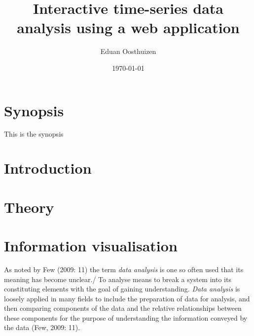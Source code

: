 \documentclass[a4paper,12pt]{article}
\title{Interactive time-series data analysis using a web application}
\author{Eduan Oosthuizen}
\date{\today}
\begin{document}
\maketitle
\makecoverpage

\pagestyle{plain}
\thispagestyle{plain}

\begin{center}
\LARGE\textbf{\thetitle}
\end{center}

\section*{Synopsis}
This is the synopsis

\newpage
\tableofcontents
\newpage
\listoffigures
\newpage
\listoftables
\newpage
\printnomenclature
\newpage

\pagestyle{plain}
\setcounter{page}{1}

\section{Introduction}

\section{Theory}

\section{Information visualisation}
As noted by Few (2009: 11) the term \emph{data analysis} is one so often used that its meaning has become unclear./
To analyse means to break a system into its constituting elements with the goal of gaining understanding.
\emph{Data analysis} is loosely applied in many fields to include the preparation of data for analysis, and then comparing components
of the data and the relative relationships between these components for the purpose of understanding the information conveyed by the data (Few, 2009: 11).
\end{document}
